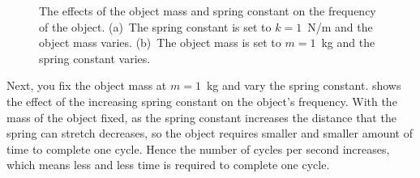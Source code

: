 \documentclass[a4paper,oneside,12pt]{article}
\begin{document}
\begin{problem}
{\begin{solution}
\begin{figure}[!htbp]
\centering
{}
\caption{%
  The effects of the object mass and spring constant on the frequency
  of the object.  (a)~The spring constant is set to $k = 1$~N/m and
  the object mass varies.  (b)~The object mass is set to $m = 1$~kg
  and the spring constant varies.
}
\label{fig:trigonometric:spring_frequency}
\end{figure}

Next, you fix the object mass at $m = 1$~kg and vary the spring
constant.
 shows
the effect of the increasing spring constant on the object's
frequency.  With the mass of the object fixed, as the spring constant
increases the distance that the spring can stretch decreases, so the
object requires smaller and smaller amount of time to complete one
cycle.  Hence the number of cycles per second increases, which means
less and less time is required to complete one cycle.


\end{solution}}
\end{problem}
\end{document}
